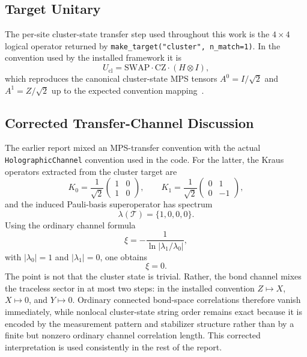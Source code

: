 \documentclass[aps,pra,twocolumn,reprint,amsmath,amssymb]{revtex4-2}
\begin{document}
\subsection{Target Unitary}
The per-site cluster-state transfer step used throughout this work is the
$4\times4$ logical operator returned by
\texttt{make\_target("cluster", n\_match=1)}. In the convention used by the
installed framework it is
\begin{equation}
U_{\mathrm{cl}} = \mathrm{SWAP}\cdot \mathrm{CZ}\cdot(H\otimes I),
\end{equation}
which reproduces the canonical cluster-state MPS tensors
$A^0 = I/\sqrt{2}$ and $A^1 = Z/\sqrt{2}$ up to the expected convention
mapping~\cite{perez2007matrix,schollwock2011density}.

\subsection{Corrected Transfer-Channel Discussion}
The earlier report mixed an MPS-transfer convention with the actual
\texttt{HolographicChannel} convention used in the code. For the latter, the
Kraus operators extracted from the cluster target are
\begin{equation}
K_0 = \frac{1}{\sqrt{2}}
\begin{pmatrix}
1 & 0 \\
1 & 0
\end{pmatrix},
\qquad
K_1 = \frac{1}{\sqrt{2}}
\begin{pmatrix}
0 & 1 \\
0 & -1
\end{pmatrix},
\end{equation}
and the induced Pauli-basis superoperator has spectrum
\begin{equation}
\lambda(\mathcal{T}) = \{1, 0, 0, 0\}.
\end{equation}
Using the ordinary channel formula
\begin{equation}
\xi = -\frac{1}{\ln \left|\lambda_1/\lambda_0\right|},
\end{equation}
with $|\lambda_0|=1$ and $|\lambda_1|=0$, one obtains
\begin{equation}
\xi = 0.
\end{equation}
The point is not that the cluster state is trivial. Rather, the bond channel
mixes the traceless sector in at most two steps: in the installed convention
$Z \mapsto X$, $X \mapsto 0$, and $Y \mapsto 0$. Ordinary connected bond-space
correlations therefore vanish immediately, while nonlocal cluster-state string
order remains exact because it is encoded by the measurement pattern and
stabilizer structure rather than by a finite but nonzero ordinary channel
correlation length. This corrected interpretation is used consistently in the
rest of the report.
\end{document}
